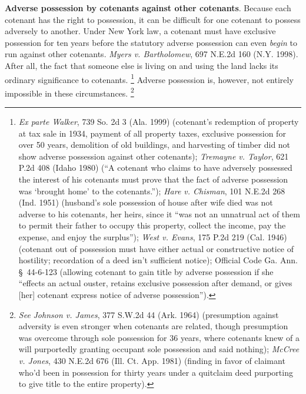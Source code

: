 \item \textbf{Adverse possession by cotenants against other cotenants}. Because
each cotenant has the right to possession, it can be difficult for one cotenant
to possess adversely to another. Under New York law, a cotenant must have
exclusive possession for ten years before the statutory adverse possession can
even \textit{begin} to run against other cotenants. \emph{Myers v. Bartholomew},
697 N.E.2d 160 (N.Y. 1998). After all, the fact that someone else is living on
and using the land lacks its ordinary significance to cotenants.
\footnote{\emph{Ex parte Walker}, 739 So. 2d 3 (Ala. 1999) (cotenant's
redemption of property at tax sale in 1934, payment of all property taxes,
exclusive possession for over 50 years, demolition of old buildings, and
harvesting of timber did not show adverse possession against other cotenants);
\emph{Tremayne v. Taylor}, 621 P.2d 408 (Idaho 1980) (``A cotenant who claims to
have adversely possessed the interest of his cotenants must prove that the fact
of adverse possession was `brought home' to the cotenants.''); \emph{Hare v.
Chisman}, 101 N.E.2d 268 (Ind. 1951) (husband's sole possession of house after
wife died was not adverse to his cotenants, her heirs, since it ``was not an
unnatrual act of them to permit their father to occupy this property, collect
the income, pay the expense, and enjoy the surplus''); \emph{West v. Evans}, 175
P.2d 219 (Cal. 1946) (cotenant out of possession must have either actual or
constructive notice of hostility; recordation of a deed isn't sufficient
notice); Official Code Ga. Ann. \S~44-6-123 (allowing cotenant to gain title by
adverse possession if she ``effects an actual ouster, retains exclusive
possession after demand, or gives [her] cotenant express notice of adverse
possession'').}
Adverse possession is, however, not entirely impossible in these circumstances.
\footnote{\textit{See} \emph{Johnson v. James}, 377 S.W.2d 44 (Ark. 1964)
(presumption against adversity is even stronger when cotenants are related,
though presumption was overcome through sole possession for 36 years, where
cotenants knew of a will purportedly granting occupant sole possession and said
nothing); \emph{McCree v. Jones}, 430 N.E.2d 676 (Ill. Ct. App. 1981) (finding
in favor of claimant who'd been in possession for thirty years under a quitclaim
deed purporting to give title to the entire property).}


